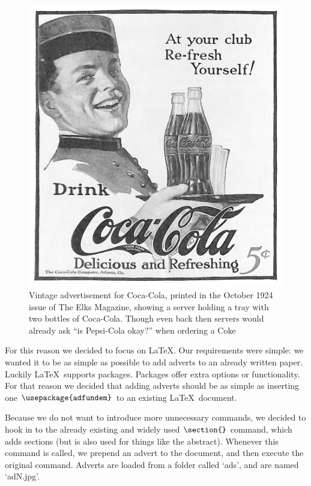 \documentclass[letterpaper, twocolumn]{article}
\begin{document}
	\begin{figure}[tbh]
		\begin{center}
			\includegraphics[width=0.9\linewidth]{figs/coca-cola.png}
			\caption{Vintage advertisement for Coca-Cola, printed in the October 1924 issue of The Elks Magazine, showing a server holding a tray with two bottles of Coca-Cola. Though even back then servers would already ask ``is Pepsi-Cola okay?'' when ordering a Coke}
			\label{fig:coca-cola}
		\end{center}
	\end{figure} 
	
	For this reason we decided to focus on \LaTeX. Our requirements were simple: we wanted it to be as simple as possible to add adverts to an already written paper. Luckily \LaTeX\ supports packages. Packages offer extra options or functionality. For that reason we decided that adding adverts should be as simple as inserting one $\verb|\usepackage{adfundem}|$ to an existing \LaTeX\ document.
	
	Because we do not want to introduce more unnecessary commands, we decided to hook in to the already existing and widely used $\verb|\section{}|$ command, which adds sections (but is also used for things like the abstract). Whenever this command is called, we prepend an advert to the document, and then execute the original command. Adverts are loaded from a folder called `ads', and are named `adN.jpg'. 
	
\end{document}

